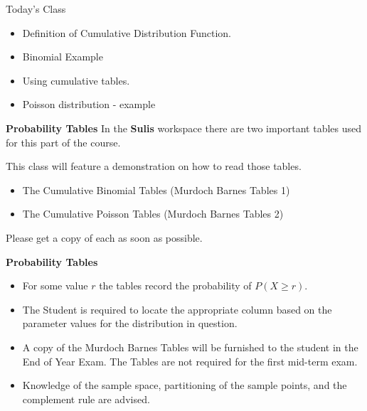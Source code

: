 \documentclass[]{report}
\begin{document}

{Today's Class}
\begin{itemize}
\item Definition of Cumulative Distribution Function.
\item Binomial Example
\item Using cumulative tables.
\item Poisson distribution - example

\end{itemize}





{
\textbf{Probability Tables}
In the \textbf{Sulis} workspace there are two important tables used for this part of the course.


This class will feature a demonstration on how to read those tables.
\begin{itemize}
\item The Cumulative Binomial Tables (Murdoch Barnes Tables 1)
\item The Cumulative Poisson Tables (Murdoch Barnes Tables 2)
\end{itemize}

Please get a copy of each as soon as possible.

}

{
\textbf{Probability Tables}
\begin{itemize}
\item For some value $r$ the tables record the probability of $P(X \geq r)$.
\item The Student is required to locate the appropriate column based on the parameter values for the distribution in question.
\item A copy of the Murdoch Barnes Tables will be furnished to the student in the End of Year Exam. The Tables are not required for the first mid-term exam.
\item Knowledge of the sample space, partitioning of the sample points, and the complement rule are advised.
\end{itemize}
}
\end{document}
